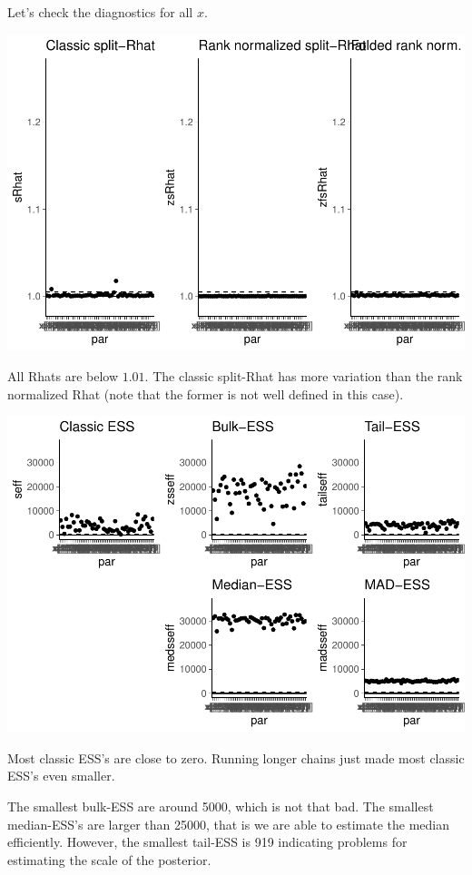 \documentclass[american,]{article}
\begin{document}
Let's check the diagnostics for all \(x\).

\includegraphics{graphics/rhat-fit-nom-td20l-1.pdf}

All Rhats are below \(1.01\). The classic split-Rhat has more variation
than the rank normalized Rhat (note that the former is not well defined
in this case).

\includegraphics{graphics/ess-fit-nom-td20l-1.pdf}

Most classic ESS's are close to zero. Running longer chains just made
most classic ESS's even smaller.

The smallest bulk-ESS are around 5000, which is not that bad. The
smallest median-ESS's are larger than 25000, that is we are able to
estimate the median efficiently. However, the smallest tail-ESS is 919
indicating problems for estimating the scale of the posterior.
\end{document}
